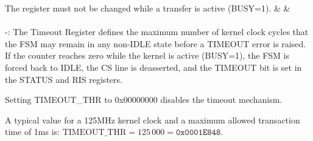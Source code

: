 The register must not be changed while a transfer is active (BUSY=1).
                             {}
                             {}
                             {}
                             {}
                             {}
                             {&}
                             {&}

\paragraph{\asqspiTimeoutRegExt} -:
The Timeout Register defines the maximum number of kernel clock cycles that the
FSM may remain in any non-IDLE state before a TIMEOUT error is raised.
If the counter reaches zero while the kernel is active (BUSY=1), the FSM
is forced back to IDLE, the CS line is deasserted, and the TIMEOUT bit is set
in the STATUS and RIS registers.

Setting TIMEOUT\_THR to 0x00000000 disables the timeout mechanism.

A typical value for a 125\;MHz kernel clock and a maximum allowed transaction time
of 1\;ms is: $\text{TIMEOUT\_THR} = 125\,000 = \texttt{0x0001E848}$.

                             {}
                             {}
                             {}
                             {}
                             {}
                             {}
                             {}




